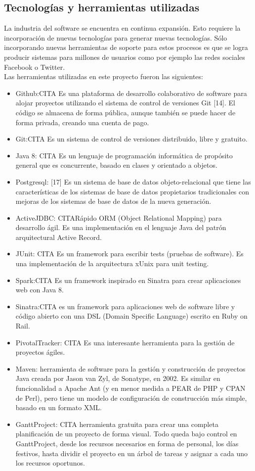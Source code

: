 \subsection{Tecnologías y herramientas utilizadas}
La industria del software se encuentra en continua expansión. Esto requiere la incorporación de nuevas tecnologías para generar
nuevas tecnologías. Sólo incorporando nuevas herramientas de soporte para estos procesos es que se logra producir sistemas para millones
de usuarios como por ejemplo las redes sociales Facebook o Twitter. \\
Las herramientas utilizadas en este proyecto fueron las siguientes:
 \begin{itemize}
 \item Github:CITA Es una plataforma de desarrollo colaborativo de software para alojar proyectos utilizando el sistema de control de versiones Git [14]. El código se almacena de forma pública, aunque también se puede hacer de forma privada, creando una cuenta de pago. 
 \item Git:CITA Es un sistema de control de versiones distribuido, libre y gratuito.
 \item Java 8: CITA Es un lenguaje de programación informática de propósito general que es concurrente, basado en clases y orientado a objetos.
 \item Postgresql: [17] Es un sistema de base de datos objeto-relacional que tiene las características de los sistemas de base de datos propietarios tradicionales con mejoras de los sistemas de base de datos de la nueva generación.
 \item ActiveJDBC: CITARápido ORM (Object Relational Mapping) para desarrollo ágil. Es una implementación en el lenguaje Java del patrón arquitectural Active Record.
 \item JUnit: CITA Es un framework para escribir tests (pruebas de software). Es una implementación de la arquitectura xUnix para unit testing.
 \item Spark:CITA Es un framework inspirado en Sinatra para crear aplicaciones web con Java 8.
 \item Sinatra:CITA es un framework para aplicaciones web de software libre y código abierto con una DSL (Domain Specific Language) escrito en Ruby on Rail.
 \item PivotalTracker: CITA Es una interesante herramienta para la gestión de proyectos ágiles.
 \item Maven: herramienta de software para la gestión y construcción de proyectos Java creada por Jason van Zyl, de Sonatype, en 2002. Es similar en funcionalidad a Apache Ant (y en menor medida a PEAR de PHP y CPAN de Perl), pero tiene un modelo de configuración de construcción más simple, basado en un formato XML.
 \item GanttProject: CITA herramienta gratuita para crear una completa planificación de un proyecto de forma visual. Todo queda bajo control en GanttProject, desde los recursos necesarios en forma de personal, los días festivos, hasta dividir el proyecto en un árbol de tareas y asignar a cada uno los recursos oportunos.
\end{itemize}


